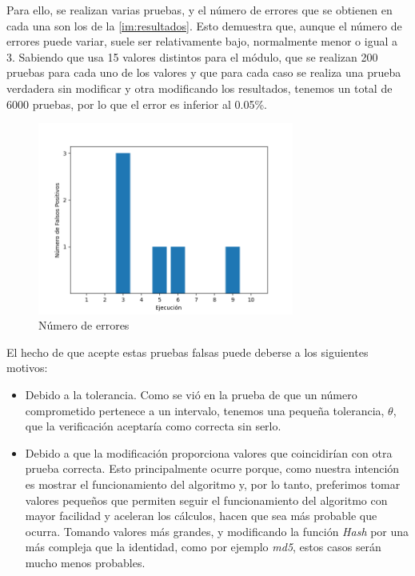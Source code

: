 Para ello, se realizan varias pruebas, y el número de errores que se obtienen en cada una son los de la \autoref{im:resultados}. Esto demuestra que, aunque el número de errores puede variar, suele ser relativamente bajo, normalmente menor o igual a 3. Sabiendo que usa 15 valores distintos para el módulo, que se realizan 200 pruebas para cada uno de los valores y que para cada caso se realiza una prueba verdadera sin modificar y otra modificando los resultados, tenemos un total de 6000 pruebas, por lo que el error es inferior al 0.05\%.

\begin{figure}[H]
    \centering
    \includegraphics[width=0.75\textwidth]{images/resultados.png}
    \caption{Número de errores}
    \label{im:resultados}
\end{figure}

El hecho de que acepte estas pruebas falsas puede deberse a los siguientes motivos:
\begin{itemize}
    \item Debido a la tolerancia. Como se vió en la prueba de que un número comprometido pertenece a un intervalo, tenemos una pequeña tolerancia, $\theta$, que la verificación aceptaría como correcta sin serlo.

    \item Debido a que la modificación proporciona valores que coincidirían con otra prueba correcta. Esto principalmente ocurre porque, como nuestra intención es mostrar el funcionamiento del algoritmo y, por lo tanto, preferimos tomar valores pequeños que permiten seguir el funcionamiento del algoritmo con mayor facilidad y aceleran los cálculos, hacen que sea más probable que ocurra. Tomando valores más grandes, y modificando la función \emph{Hash} por una más compleja que la identidad, como por ejemplo \emph{md5}, estos casos serán mucho menos probables.
\end{itemize}

